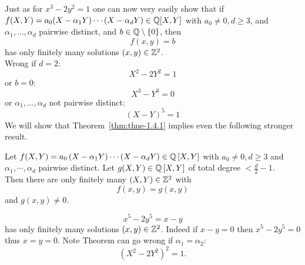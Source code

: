\documentclass[NumTh.tex]{subfiles}
\begin{document}
Just as for $x^3-2y^2=1$ one can now very easily show that if $f(X,Y)=a_0 (X-\alpha_1 Y)\cdots(X-\alpha_d Y)\in\mathbb{Q}[X,Y]$ with $a_0\ne0, d\ge 3$, and $\alpha_1,\dots,\alpha_d$ pairwise distinct, and $b\in\mathbb{Q}\setminus\left\{0\right\}$, then
\[ f(x,y)=b \]
has only finitely many solutions $\left(x,y\right)\in\mathbb{Z}^2$. \\
Wrong if $d=2$:
\[ X^2-2Y^2=1 \]
or $b=0$:
\[ X^3-Y^3=0 \]
or $\alpha_1,\dots,\alpha_d$ not pairwise distinct: 
\[ (X-Y)^5=1 \]
We will show that Theorem~\ref{thm:thue-1.4.1} implies even the following stronger result.

\begin{theorem}
Let $f(X,Y)=a_0 \left(X-\alpha_1 Y\right)\cdots\allowbreak\left(X-\alpha_d Y\right)\in\mathbb{Q}\left[X,Y\right]$ with $a_0\ne 0, d\ge 3$ and $\alpha_1,\cdots,\alpha_d$ pairwise distinct. Let $g(X,Y)\in\mathbb{Q}\left[X,Y\right]$ of total degree $<\frac{d}{2}-1$. 
\\
Then there are only finitely many $(X,Y)\in\mathbb{Z}^2$ with
\[ f(x,y)=g(x,y) \]
and
$g(x,y)\ne 0$.
\end{theorem}

\begin{ex}
\[ x^5-2y^5=x-y \]
has only finitely many solutions $\left(x,y\right)\in\mathbb{Z}^2$. Indeed if $x-y=0$ then $x^5-2y^5=0$ thus $x=y=0$. 
Note Theorem can go wrong if $\alpha_1=\alpha_2$: 
\[ (X^2-2Y^2 )^2=1. \]
\end{ex}
\end{document}
